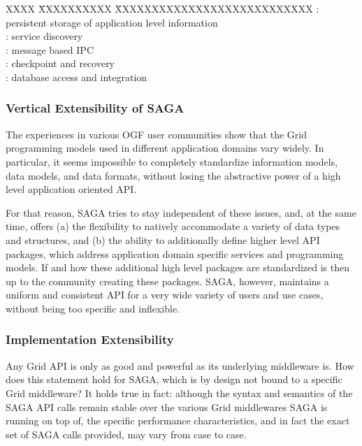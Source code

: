    \begin{tabbing}
    XXXX      \= XXXXXXXXXX \= XXXXXXXXXXXXXXXXXXXXXXXXXXX \kill
    \> :  \> persistent storage of application level information\footnotemark[2]\\
    \> :       \> service discovery\footnotemark[2]\\
    \> : \> message based IPC\\
    \> :      \> checkpoint and recovery\\
    \> :     \> database access and integration
   \end{tabbing}

  

  \subsubsection*{Vertical Extensibility of SAGA}

   The experiences in various OGF user communities show that the
   Grid programming models used in different application domains vary
   widely.  In particular, it seems impossible to completely
   standardize information models, data models, and data formats,
   without losing the abstractive power of a high level application
   oriented API.


   For that reason, SAGA tries to stay independent of these issues,
   and, at the same time, offers (a) the flexibility to natively
   accommodate a variety of data types and structures, and (b) the
   ability to additionally define higher level API packages, which
   address application domain specific services and programming
   models.  If and how these additional high level packages are 
   standardized is then up to the community creating these packages.
   SAGA, however, maintains a uniform and consistent API for a
   very wide variety of users and use cases, without being too specific
   and inflexible.

 
  \subsubsection*{Implementation Extensibility}

   Any Grid API is only as good and powerful as its underlying
   middleware is.  How does this statement hold for SAGA, which is by
   design not bound to a specific Grid middleware?  It holds true in
   fact: although the syntax and semantics of the SAGA API calls
   remain stable over the various Grid middlewares SAGA is running on
   top of, the specific performance characteristics, and in fact the
   exact set of SAGA calls provided, may vary from case to case.

